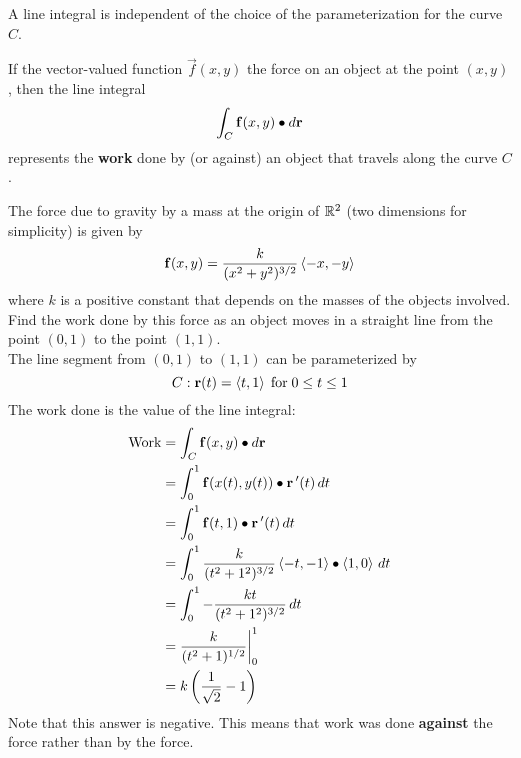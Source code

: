 \documentclass[handout]{ximera}
\begin{document}
\begin{remark}
A line integral is independent of the choice of the parameterization for the curve $C$. 
\end{remark}

If the vector-valued function $\vec f(x,y)$ the force on an object at the point $(x,y)$, then the line integral
\[
\int_C \mathbf f(x,y) \bullet  d\mathbf r
\]
represents the \textbf{work} done by (or against) an object that travels along the curve $C$.

\begin{example}[Example 2]
The force due to gravity by a mass at the origin of $\mathbb R^2$ (two dimensions for simplicity) is given by
\[
\mathbf f(x,y) = \frac{k}{(x^2 + y^2)^{3/2}} \left\langle -x, -y\right\rangle
\]
where $k$ is a positive constant that depends on the masses of the objects involved. Find the work done 
by this force as an object moves in a straight line from the point $(0,1)$ to the point $(1,1)$.\\
The line segment from $(0,1)$ to $(1,1)$ can be parameterized by
\[
C: \mathbf r(t) = \left\langle t, 1\right\rangle \; \text{for}   \; 0 \leq t \leq 1
\]
The work done is the value of the line integral:
\begin{align*}
\text{Work} &= \int_C \mathbf f(x,y) \bullet d\mathbf r\\
            &= \int_0^1 \mathbf f(x(t),y(t)) \bullet \mathbf r\,'(t) \, dt\\
            &= \int_0^1 \mathbf f(t, 1) \bullet \mathbf r\,'(t) \, dt\\
            &= \int_0^1 \frac{k}{(t^2 + 1^2)^{3/2}} \left\langle -t,-1\right\rangle \bullet \left\langle 1,0\right\rangle \, dt\\
            &= \int_0^1 -\frac{kt}{(t^2 + 1^2)^{3/2}} \, dt\\
            &= \frac{k}{(t^2 +1)^{1/2}} \bigg|_0^1 \\
            &= k\left(\frac{1}{\sqrt 2} - 1\right)
\end{align*}
Note that this answer is negative.  This means that work was done \textbf{against} the force rather than by the force.
\end{example}
\end{document}
